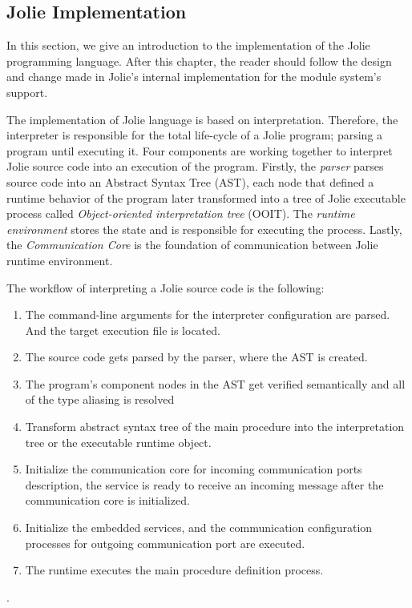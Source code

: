 \subsection{Jolie Implementation}
\label{sec:jolie-implementation}
In this section, we give an introduction to the implementation of the Jolie programming language. After this chapter, the reader should follow the design and change made in Jolie's internal implementation for the module system's support.

The implementation of Jolie language is based on interpretation. Therefore, the interpreter is responsible for the total life-cycle of a Jolie program; parsing a program until executing it. Four components are working together to interpret Jolie source code into an execution of the program. Firstly, the \textit{parser} parses source code into an Abstract Syntax Tree (AST), each node that defined a runtime behavior of the program later transformed into a tree of Jolie executable process called \textit{Object-oriented interpretation tree} (OOIT). The \textit{runtime environment} stores the state and is responsible for executing the process. Lastly, the  \textit{Communication Core} is the foundation of communication between Jolie runtime environment.


The workflow of interpreting a Jolie source code is the following:

\begin{enumerate}
    \item The command-line arguments for the interpreter configuration are parsed. And the target execution file is located.
    \item The source code gets parsed by the parser, where the AST is created.
    \item The program's component nodes in the AST get verified semantically and all of the type aliasing is resolved
    \item Transform abstract syntax tree of the main procedure into the interpretation tree or the executable runtime object.
    \item Initialize the communication core for incoming communication ports description, the service is ready to receive an incoming message after the communication core is initialized.
    \item Initialize the embedded services, and the communication configuration processes for outgoing communication port are executed.
    \item The runtime executes the main procedure definition process.
\end{enumerate}.

\FloatBarrier
